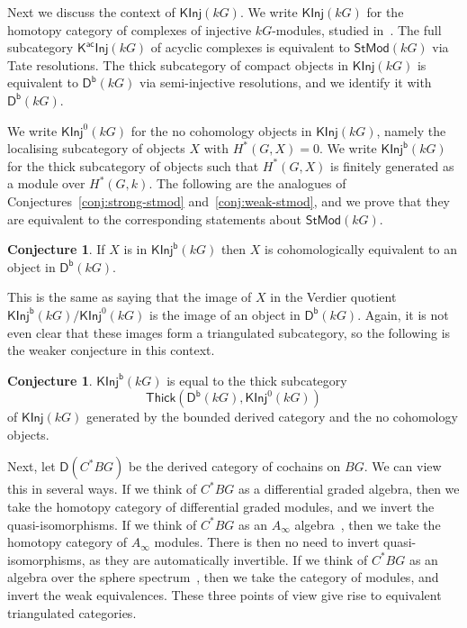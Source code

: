 \documentclass[12pt]{amsart}
\newcommand{\DD}{\mathsf{D}}%
\newcommand{\Db}{\DD^{\mathsf{b}}}%
\newcommand{\kG}{\kk G}
\newcommand{\kk}{k}
\newcommand{\KInj}{\mathsf{KInj}}
\newcommand{\KInjb}{\KInj^{\mathsf{b}}}
\newcommand{\KacInj}{\mathsf{K^{ac}Inj}}
\newcommand{\StMod}{\mathsf{StMod}}
\newcommand{\Thick}{\mathsf{Thick}}
\numberwithin{equation}{section}
\theoremstyle{plain}
\theoremstyle{definition}
\newtheorem{conjecture}[equation]{Conjecture}
\theoremstyle{remark}
\begin{document}
Next we discuss the context of $\KInj(\kG)$.
We write 
$\KInj(\kG)$ for the homotopy category of complexes of injective
$\kG$-modules, studied in~\cite{Benson/Krause:2008a}. 
The full subcategory $\KacInj(\kG)$ of acyclic complexes
is equivalent to $\StMod(\kG)$ via Tate resolutions. The thick
subcategory of compact objects in $\KInj(\kG)$ is equivalent to
$\Db(\kG)$ via semi-injective resolutions, and we identify it with
$\Db(\kG)$.

We write
$\KInj^0(\kG)$ for the no cohomology objects in $\KInj(\kG)$, namely the  
localising subcategory of objects $X$ with $H^*(G,X)=0$. We write
$\KInjb(\kG)$ for the thick subcategory of objects such that
$H^*(G,X)$ is finitely generated as a module over $H^*(G,\kk)$. The
following are the analogues of Conjectures~\ref{conj:strong-stmod} 
and~\ref{conj:weak-stmod}, and we prove that they are equivalent to
the corresponding statements about $\StMod(\kG)$.

\begin{conjecture}\label{conj:strong-Db}
If $X$ is in $\KInjb(\kG)$ then $X$ is cohomologically equivalent to
an object in $\Db(\kG)$.
\end{conjecture}

This is the same as saying that the image of $X$ in the Verdier
quotient $\KInjb(\kG)/\KInj^0(\kG)$ is the image of an object in
$\Db(\kG)$. Again, it is not even clear that these images form a
triangulated subcategory, so the following is the weaker conjecture in
this context.

\begin{conjecture}\label{conj:weak-Db}
$\KInjb(\kG)$ is equal to the thick subcategory 
\[ \Thick(\Db(\kG),\KInj^0(\kG)) \] 
of $\KInj(\kG)$ generated
by the bounded derived category and the no cohomology objects.
\end{conjecture}

Next,
let $\DD(C^*BG)$ be the derived category of cochains on $BG$.
We can view this in several ways. If we think of $C^*BG$ as a
differential graded algebra, then we take the homotopy category of
differential graded modules, and we invert the quasi-isomorphisms.
If we think of $C^*BG$ as an $A_\infty$ algebra~\cite[\S4]{Keller:2001a},
then we take the homotopy category of $A_\infty$ modules. There is
then no need to invert quasi-isomorphisms, as they are automatically
invertible. If we think of $C^*BG$ as an
algebra over the sphere spectrum~\cite[Chapter~III]{Elmendorf/Kriz/Mandell/May:1997a},
then we take the category
of modules, and invert the weak equivalences. These three points of
view give rise to equivalent triangulated categories.
\end{document}
